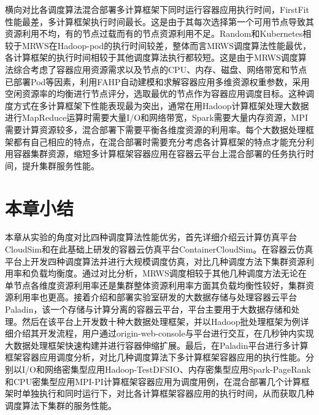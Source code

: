 横向对比各调度算法混合部署多计算框架下同时运行容器应用执行时间，FirstFit性能最差，多计算框架执行时间最长。这是由于其每次选择第一个可用节点导致其资源利用不均，有的节点过载而有的节点资源利用不足。Random和Kubernetes相较于MRWS在Hadoop-pod的执行时间较差，整体而言MRWS调度算法性能最优，各计算框架的执行时间相较于其他调度算法执行都较短。这是由于MRWS调度算法综合考虑了容器应用资源需求以及节点的CPU、内存、磁盘、网络带宽和节点已部署Pod等因素，利用FAHP自动建模和求解容器应用多维资源权重参数，采用空闲资源率的均衡进行节点评分，选取最优的节点作为容器应用调度目标。这种调度方式在多计算框架下性能表现最为突出，通常在用Hadoop计算框架处理大数据进行MapReduce运算时需要大量I/O和网络带宽，Spark需要大量内存资源，MPI需要计算资源较多，混合部署下需要平衡各维度资源的利用率。每个大数据处理框架都有自己相应的特点，在混合部署时需要充分考虑各计算框架的特点才能充分利用容器集群资源，缩短多计算框架容器应用在容器云平台上混合部署的任务执行时间，提升集群服务性能。

\section{本章小结}
本章从实验的角度对比四种调度算法性能优劣，首先详细介绍云计算仿真平台CloudSim和在此基础上研发的容器云仿真平台ContainerCloudSim。在容器云仿真平台上开发四种调度算法并进行大规模调度仿真，对比几种调度方法下集群资源利用率和负载均衡度。通过对比分析，MRWS调度相较于其他几种调度方法无论在单节点各维度资源利用率还是集群整体资源利用率方面其负载均衡性较好，集群资源利用率也更高。接着介绍和部署实验室研发的大数据存储与处理容器云平台Paladin，该一个存储与计算分离的容器云平台，平台主要用于大数据存储和处理。然后在该平台上开发数十种大数据处理框架，并以Hadoop批处理框架为例详细介绍其开发流程，用户通过origin-web-console与平台进行交互，在几秒钟内实现大数据处理框架快速构建并进行容器伸缩扩展。最后，在Paladin平台进行多计算框架容器应用调度分析，对比几种调度算法下多计算框架容器应用的执行性能。分别以I/O和网络密集型应用Hadoop-TestDFSIO、内存密集型应用Spark-PageRank和CPU密集型应用MPI-PI计算框架容器应用为调度用例，在混合部署几个计算框架时单独执行和同时运行下，对比各计算框架容器应用的执行时间，从而获取几种调度算法下集群的服务性能。



















